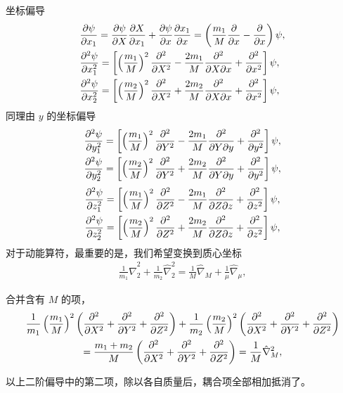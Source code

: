 坐标偏导
\begin{align}
    &\pdv{\psi}{x_1} = \pdv{\psi}{X} \pdv{X}{x_1} + \pdv{\psi}{x}\pdv{x_1}{x} =
    \left(\frac{m_1}{M} \pdv{x} - \pdv{x}\right)\psi, \\
    &\pdv[2]{\psi}{x_1} = 
    \left[
        \left(\frac {m_1}M\right)^2 \pdv[2]{X} - \frac{2m_1}{M} \pdv[2]{}{X}{x} + \pdv[2]{x}
    \right]\psi,
    \\
    &\pdv[2]{\psi}{x_2} = 
    \left[
        \left(\frac {m_2}M\right)^2 \pdv[2]{X} + \frac{2m_2}{M} \pdv[2]{}{X}{x} + \pdv[2]{x}
    \right]\psi,
\end{align}
同理由 $y$ 的坐标偏导
\begin{align}
    &\pdv[2]{\psi}{y_1} = 
    \left[
        \left(\frac {m_1}M\right)^2 \pdv[2]{Y} - \frac{2m_1}{M} \pdv[2]{}{Y}{y} + \pdv[2]{y}
    \right]\psi,
    \\
    &\pdv[2]{\psi}{y_2} = 
    \left[
        \left(\frac {m_2}M\right)^2 \pdv[2]{Y} + \frac{2m_2}{M} \pdv[2]{}{Y}{y} + \pdv[2]{y}
    \right]\psi,
\end{align}
\begin{align}
    &\pdv[2]{\psi}{z_1} = 
    \left[
        \left(\frac {m_1}M\right)^2 \pdv[2]{Z} - \frac{2m_1}{M} \pdv[2]{}{Z}{z} + \pdv[2]{z}
    \right]\psi,
    \\
    &\pdv[2]{\psi}{z_2} = 
    \left[
        \left(\frac {m_2}M\right)^2 \pdv[2]{Z} + \frac{2m_2}{M} \pdv[2]{}{Z}{z} + \pdv[2]{z}
    \right]\psi,
\end{align}
对于动能算符，最重要的是，我们希望变换到质心坐标
\begin{align}
    \frac1{m_1} \hat \nabla_2^2 + \frac1{m_2} \hat \nabla_2^2  = \frac1M \hat \nabla_M + \frac1{\mu} \hat \nabla_\mu,
\end{align}

合并含有 $M$ 的项，
\begin{multline}
    \frac 1{m_1} 
    \left(\frac{m_1}M\right)^2
    \left(
        \pdv[2]{X} + \pdv[2]{Y} + \pdv[2]{Z}
    \right) 
    + \frac1{m_2} 
    \left(\frac{m_2}M\right)^2 
    \left(
        \pdv[2]{X} + \pdv[2]{Y} + \pdv[2]{Z}
    \right) \\
     = \frac{m_1 + m_2}{M} \left(
        \pdv[2]{X} + \pdv[2]{Y} + \pdv[2]{Z}
     \right) = \frac1M \hat \nabla_M^2,
\end{multline}

以上二阶偏导中的第二项，除以各自质量后，耦合项全部相加抵消了。

